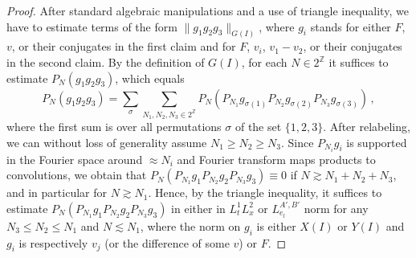 \documentclass[10pt,leqno]{amsart}
\numberwithin{equation}{section}
\newcommand{\Z}{\mathbb{Z}}
\begin{document}
\begin{proof}
After standard algebraic manipulations and a use of triangle inequality, we have to estimate terms of the form $\|g_1 g_2g_3\|_{G(I)}$, where $g_i$ stands for either $F$, $v$, or their conjugates
in the first claim and for $F$, $v_i$, $v_1 - v_2$, or their conjugates in the second claim. By the definition of $G(I)$, for each $N \in 2^\Z$ it suffices  to estimate $P_N(g_1 g_2g_3)$, which equals
$$
P_N(g_1 g_2g_3) = \sum_{\sigma} \sum_{N_1, N_2, N_3 \in 2^\Z} P_N(P_{N_1}g_{\sigma(1)} P_{N_2}g_{\sigma(2)} P_{N_3} g_{\sigma(3)})  \,,
$$
where the first sum is over all permutations $\sigma$ of the set $\{1, 2, 3\}$.
After relabeling, we can without loss of generality assume $N_1 \geq N_2 \geq N_3$. Since $P_{N_i} g_i$ is supported in the Fourier space around $\approx N_i$ and Fourier transform 
maps products to convolutions, we obtain that $P_N(P_{N_1}g_1 P_{N_2}g_2 P_{N_3} g_3) \equiv 0$ if $N \gtrsim N_1+ N_2 + N_3$, and in particular for $N \gtrsim N_1$. 
Hence, by the triangle inequality, it suffices to estimate  $P_N(P_{N_1}g_1 P_{N_2}g_2 P_{N_3} g_3)$ in either in $L^1_tL^2_x$ or $L^{A', B'}_{e_l}$ norm for any $N_3 \leq N_2 \leq N_1$ and $N \lesssim N_1$, 
where the norm on $g_i$ is either $X(I)$ or $Y(I)$ and $g_i$ is respectively $v_j$ (or the difference of some $v$) or $F$.


\end{proof}
\end{document}
